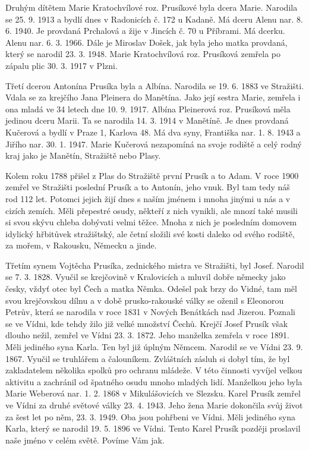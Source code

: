 \documentclass[../dejiny-rodu-prusiku.tex]{subfiles}
\begin{document}
Druhým dítětem Marie Kratochvílové roz. Prusíkové byla dcera Marie. Narodila se 25. 9. 1913 a bydlí dnes v Radonicích č. 172 u Kadaně. Má dceru Alenu nar. 8. 6. 1940. Je provdaná Prchalová a žije v Jincích č. 70 u Příbrami. Má dcerku. Alenu nar. 6. 3. 1966. Dále je Miroslav Došek, jak byla jeho matka provdaná, který se narodil 23. 3. 1948. Marie Kratochvílová roz. Prusíková zemřela po zápalu plic 30. 3. 1917 v Plzni.

Třetí dcerou Antonína Prusíka byla a Albína. Narodila se 19. 6. 1883 ve Stražišti. Vdala se za krejčího Jana Pleinera do Manětína. Jako její sestra Marie, zemřela i ona mladá ve 34 letech dne 10. 9. 1917. Albína Pleinerová roz. Prusíková měla jedinou dceru Marii. Ta se narodila 14. 3. 1914 v Manětíně. Je dnes provdaná Kučerová a bydlí v Praze 1, Karlova 48. Má dva syny, Františka nar. 1. 8. 1943 a Jiřího nar. 30. 1. 1947. Marie Kučerová nezapomíná na svoje rodiště a celý rodný kraj jako je Manětín, Stražiště nebo Plasy.

Kolem roku 1788 přišel z Plas do Stražiště první Prusík a to Adam. V roce 1900 zemřel ve Stražišti poslední Prusík a to Antonín, jeho vnuk. Byl tam tedy náš rod 112 let. Potomci jejich žijí dnes s naším jménem i mno­ha jinými u nás a v cizích zemích. Měli přepestré osu­dy, někteří z nich vynikli, ale mnozí také musili si svou skývu chleba dobývati velmi těžce. Mnoha z nich je posledním domovem idylický hřbitůvek stražištský, ale četní složili své kosti daleko od svého rodiště, za mořem, v Rakousku, Německu a jinde.

Třetím synem Vojtěcha Prusíka, zednického mistra ve Stražišti, byl Josef. Narodil se 7. 3. 1828. Vyučil se krejčovině v Kralovicích a mluvil dobře německy jako česky, vždyť otec byl Čech a matka Němka. Odešel pak brzy do Vidné, tam měl svou krejčovskou dílnu a v době prusko-rakouské války se oženil s Eleonorou Petrův, která se narodila v roce 1831 v Nových Benátkách nad Jizerou. Poznali se ve Vídni, kde tehdy žilo již velké množství Čechů. Krejčí Josef Prusík však dlouho nežil, zemřel ve Vídni 23. 3. 1872. Jeho manželka zemřela v roce 1891. Měli jediného syna Karla. Ten byl již úplným Němcem. Narodil se ve Vídni 23. 9. 1867. Vyučil se truhlářem a čalouníkem. Zvláštních zásluh si dobyl tím, že byl
zakladatelem několika spolků pro ochranu mládeže. V této činnosti vyvíjel velkou aktivitu a zachránil od špatného osudu mnoho mladých lidí. Manželkou jeho byla Marie Weberová nar. 1. 2. 1868 v Mikulášovicích ve Slezsku. Karel Prusík zemřel ve Vídni za druhé světové války 23. 4. 1943. Jeho žena Marie dokončila svůj život za šest let po něm, 23. 3. 1949. Oba jsou pohřbeni ve Vídni. Měli jediného syna Karla, který se narodil  19. 5. 1896 ve Vídni. Tento Karel Prusík později proslavil naše jméno v celém světě. Povíme Vám jak.
\end{document}
